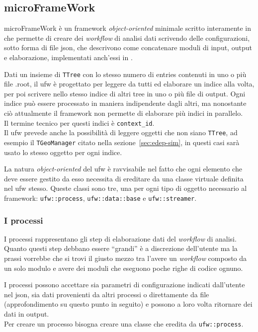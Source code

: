 \documentclass[../../main.tex]{subfiles}
\begin{document}
\subsection{microFrameWork} \label{subsec:il-micro-framework}
  microFrameWork è un framework \textit{object-oriented} minimale scritto
  interamente in \CPP{}
  che permette di creare dei \textit{workflow} di analisi dati scrivendo
  delle configurazioni, sotto forma di file json, che descrivono come
  concatenare moduli di input, output e elaborazione, implementati
  anch'essi in \CPP.

  Dati un insieme di \texttt{TTree} con lo stesso numero di entries contenuti
  in uno o più file .root, il ufw è progettato per leggere da tutti ed
  elaborare un indice alla volta, per poi scrivere nello stesso indice di
  altri tree in uno o più file di output.
  Ogni indice può essere processato in maniera indipendente dagli altri, ma
  nonostante ciò attualmente il framework non permette di
  elaborare più indici in parallelo.\\
  Il termine tecnico per questi indici è \texttt{context\_id}.\\
  Il ufw prevede anche la possibilità di leggere oggetti che non siano
  \texttt{TTree}, ad esempio il \texttt{TGeoManager} citato nella
  sezione~\ref{sec:edep-sim}, in questi casi sarà usato lo stesso oggetto
  per ogni indice.

  La natura \textit{object-oriented} del ufw è ravvisabile nel fatto che
  ogni elemento che deve essere gestito da esso necessita di ereditare da
  una classe virtuale definita nel ufw stesso.
  Queste classi sono tre, una per ogni tipo di oggetto necessario al
  framework: \texttt{ufw::process}, \texttt{ufw::data::base} e
  \texttt{ufw::streamer}.

  \subsubsection*{I processi}
    I processi rappresentano gli step di elaborazione dati del
    \textit{workflow} di analisi.
    Quanto questi step debbano essere ``grandi'' è a discrezione
    dell'utente ma la prassi vorrebbe che si trovi il giusto mezzo tra
    l'avere un \textit{workflow} composto da un solo modulo e avere dei
    moduli che eseguono poche righe di codice ognuno.

    I processi possono accettare sia parametri di configurazione indicati
    dall'utente nel json, sia dati provenienti da altri processi o
    direttamente da file (approfondimento su questo punto in seguito) e
    possono a loro volta ritornare dei dati in output.\\
    Per creare un processo bisogna creare una classe che eredita da
    \texttt{ufw::process}.
\end{document}
